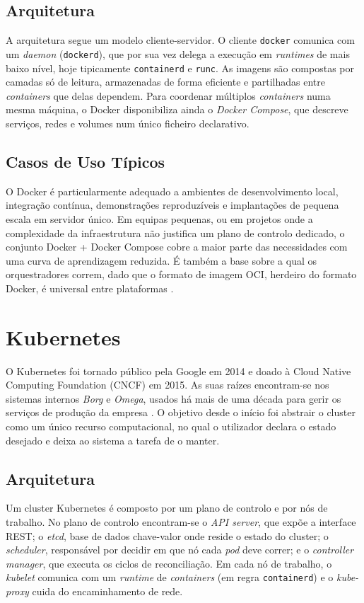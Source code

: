 \documentclass[conference]{IEEEtran}
\begin{document}
\subsection{Arquitetura}
A arquitetura segue um modelo cliente-servidor. O cliente \texttt{docker} comunica com um \textit{daemon} (\texttt{dockerd}), que por sua vez delega a execução em \textit{runtimes} de mais baixo nível, hoje tipicamente \texttt{containerd} e \texttt{runc}. As imagens são compostas por camadas só de leitura, armazenadas de forma eficiente e partilhadas entre \textit{containers} que delas dependem. Para coordenar múltiplos \textit{containers} numa mesma máquina, o Docker disponibiliza ainda o \textit{Docker Compose}, que descreve serviços, redes e volumes num único ficheiro declarativo.

\subsection{Casos de Uso Típicos}
O Docker é particularmente adequado a ambientes de desenvolvimento local, integração contínua, demonstrações reproduzíveis e implantações de pequena escala em servidor único. Em equipas pequenas, ou em projetos onde a complexidade da infraestrutura não justifica um plano de controlo dedicado, o conjunto Docker + Docker Compose cobre a maior parte das necessidades com uma curva de aprendizagem reduzida. É também a base sobre a qual os orquestradores correm, dado que o formato de imagem OCI, herdeiro do formato Docker, é universal entre plataformas \cite{pahl2019}.

\section{Kubernetes}
O Kubernetes foi tornado público pela Google em 2014 e doado à Cloud Native Computing Foundation (CNCF) em 2015. As suas raízes encontram-se nos sistemas internos \textit{Borg} e \textit{Omega}, usados há mais de uma década para gerir os serviços de produção da empresa \cite{verma2015,burns2016}. O objetivo desde o início foi abstrair o cluster como um único recurso computacional, no qual o utilizador declara o estado desejado e deixa ao sistema a tarefa de o manter.

\subsection{Arquitetura}
Um cluster Kubernetes é composto por um plano de controlo e por nós de trabalho. No plano de controlo encontram-se o \textit{API server}, que expõe a interface REST; o \textit{etcd}, base de dados chave-valor onde reside o estado do cluster; o \textit{scheduler}, responsável por decidir em que nó cada \textit{pod} deve correr; e o \textit{controller manager}, que executa os ciclos de reconciliação. Em cada nó de trabalho, o \textit{kubelet} comunica com um \textit{runtime} de \textit{containers} (em regra \texttt{containerd}) e o \textit{kube-proxy} cuida do encaminhamento de rede.
\end{document}

